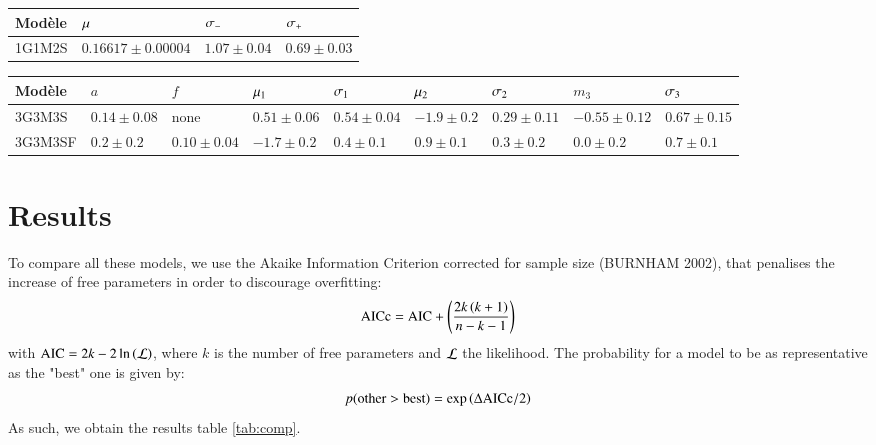 \documentclass{aa}
\begin{document}
\begin{table}[htbp!]
\begin{tabularx}{\linewidth}{|Y*{3}{|Y}|}\hline

     Modèle & $\mu$ & $\sigma_-$ & $\sigma_+$ \\\hline\hline

    1G1M2S & $0.16617 \pm 0.00004$ & $1.07 \pm 0.04$ & $0.69 \pm 0.03$ \\\hline

\end{tabularx} \bigbreak

\begin{tabularx}{\linewidth}{|Y*{8}{|Y}|}\hline

     Modèle & $a$ & $f$ & $\mu_1$ & $\sigma_1$ & $\mu_2$ & $\sigma_2$ &
    $m_3$ & $\sigma_3$ \\\hline\hline

    3G3M3S & $0.14 \pm 0.08$ & none & $0.51 \pm 0.06$ & $0.54 \pm 0.04$ & $-1.9
    \pm 0.2$ & $0.29 \pm 0.11$ & $-0.55 \pm 0.12$ & $0.67 \pm 0.15$ \\\hline
    
    3G3M3SF & $0.2 \pm 0.2 $ & $0.10 \pm 0.04 $ & $-1.7 \pm 0.2$ & $0.4 \pm 0.1$
            & $0.9 \pm 0.1$ & $0.3 \pm 0.2$ & $0.0 \pm 0.2$ & $0.7 \pm 0.1$
            \\\hline

\end{tabularx} \bigbreak

\end{table}



\section{Results}
To compare all these models, we use the Akaike Information Criterion corrected
for sample size (BURNHAM 2002), that penalises the increase of free parameters
in order to discourage overfitting:
\begin{equation}
    \mathrm{AICc} = \mathrm{AIC} + \left(\frac{2k\left(k+1\right)}{n - k - 1}\right)
\end{equation}
with $\mathrm{AIC} = 2k - 2\ln\left(\mathcal{L}\right)$, where $k$ is the number of free
parameters and $\mathcal{L}$ the likelihood. The probability for a model to be as
representative as the "best" one is given by:
\begin{equation}
    p(\mathrm{other} > \mathrm{best}) = \exp\left(\Delta\mathrm{AICc}/2\right)
\end{equation}
As such, we obtain the results table \ref{tab:comp}.
\end{document}
